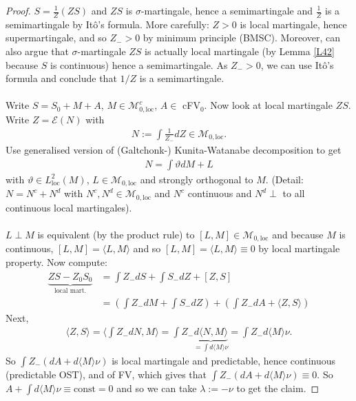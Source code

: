 \documentclass[12pt,a4paper, twoside]{article}
\theoremstyle{definition}
\begin{document}
\begin{proof}
$S= \frac{1}{Z}(ZS)$ and $ZS$ is $\sigma$-martingale, hence a semimartingale and $\frac{1}{Z}$ is a semimartingale by Itô's formula. More carefully: $Z>0$ is local martingale,  hence supermartingale, and so $Z_- >0$ by minimum principle (BMSC). Moreover, can also argue that $\sigma$-martingale $ZS$ is actually local martingale (by Lemma \ref{L42} because $S$ is continuous) hence a semimartingale. As $Z_- >0$, we can use Itô's formula and conclude that $1/Z$ is a semimartingale. 
\\\\
Write $S= S_0 + M + A$, $M \in \mathcal{M}_{0, \text{loc}}^c$, $A \in $ cFV$_0$. Now look at local martingale $ZS$. Write $Z = \mathcal{E}(N)$ with 
\begin{align*}
N:= \int \frac{1}{Z_-}dZ \in \mathcal{M}_{0, \text{loc}}.
\end{align*}
Use generalised version of (Galtchonk-) Kunita-Watanabe decomposition to get 
\begin{align*}
N= \int \vartheta dM + L
\end{align*}
with $\vartheta \in L_\text{loc}^2(M)$, $L \in \mathcal{M}_{0, \text{loc}}$ and strongly orthogonal to $M$. (Detail: $N=N^c +N^d$ with $N^c, N^d \in \mathcal{M}_{0, \text{loc}}$ and $N^c$ continuous and $N^d \perp$ to all continuous local martingales). 
\\\\
$L \perp M$ is equivalent (by the product rule) to $[L,M] \in \mathcal{M}_{0, \text{loc}}$ and because $M$ is continuous, $[L,M]= \langle L, M \rangle$ and so $[L,M] = \langle L,M \rangle \equiv 0$ by local martingale property. Now compute: 
\begin{align*}
\underbrace{ZS-Z_0S_0}_\text{local mart.} &= \int Z_- dS + \int S_- dZ + [Z,S] \\
&= \left( \int Z_- dM + \int S_- dZ \right) + \left( \int Z_- dA + \langle Z,S \rangle \right)
\end{align*}
Next,  
\begin{align*}
\langle Z,S \rangle = \langle \int Z_- d N, M \rangle = \int Z_- \underbrace{d \langle N, M \rangle}_{= \int d \langle M \rangle \nu} = \int Z_- d \langle M \rangle \nu.
\end{align*}
So $\int Z_- ( dA + d \langle M \rangle \nu)$ is local martingale and predictable, hence continuous (predictable OST), and of FV,  which gives that $ \int Z_- (dA + d \langle M \rangle \nu) \equiv 0$. So $A + \int d \langle M \rangle \nu \equiv \text{const}=0$ and so we can take $\lambda :=- \nu$ to get the claim. 
\end{proof}
\end{document}
